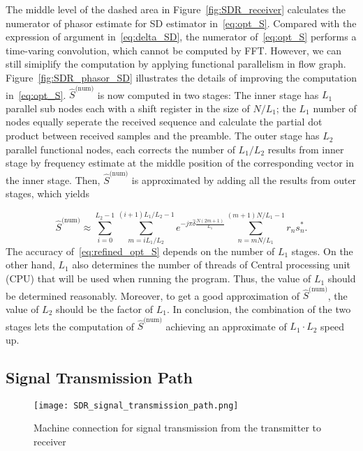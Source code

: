 The middle level of the dashed area in Figure~\ref{fig:SDR_receiver} calculates the numerator of phasor estimate for SD estimator in~\eqref{eq:opt_S}.
Compared with the expression of argument in~\eqref{eq:delta_SD}, the numerator of~\eqref{eq:opt_S} performs a time-varing convolution, which cannot be computed
by FFT. However, we can still simiplify the computation by applying functional parallelism in flow graph. 
Figure~\ref{fig:SDR_phasor_SD} illustrates the details of improving the computation in~\eqref{eq:opt_S}. 
$\hat{S}^{\text{(num)}}$ is now computed in two stages: The inner stage has $L_1$ parallel sub nodes each with a shift register in the size of
$N/L_1$; the $L_1$ number of nodes equally seperate the received sequence and calculate the partial dot product
between received samples and the preamble. The outer stage has $L_2$ parallel functional nodes, each corrects the number of $L_1/L_2$ results
from inner stage by frequency estimate at the middle position of the corresponding vector in the inner stage.
Then, $\hat{S}^{\text{(num)}}$ is approximated by adding all the results from outer stages, which yields

\begin{equation}
  \label{eq:refined_opt_S}
  \hat{S}^{\text{(num)}} \approx \sum_{i=0}^{L_2-1} \sum_{m=iL_1/L_2}^{(i+1)L_1/L_2-1} e^{-j\pi \hat{\delta}\frac{N(2m+1)}{L_1}}
  \sum_{n=mN/L_1}^{(m+1)N/L_1-1}r_ns_n^*.
\end{equation}
The accuracy of~\eqref{eq:refined_opt_S} depends on the number of $L_1$ stages. On the other hand,
$L_1$ also determines the number of threads of Central processing unit (CPU) that will be used when running the program.
Thus, the value of $L_1$ should be determined reasonably. 
Moreover, to get a good approximation of $\hat{S}^{\text{(num)}}$, the value of $L_2$ should be the factor of $L_1$.
In conclusion, the combination of the two stages lets the computation of 
$\hat{S}^{\text{(num)}}$ achieving an approximate of $L_1\cdot L_2$ speed up.

\subsection{Signal Transmission Path}

\begin{figure}[t]
  \centerline{\texttt{[image: SDR\_signal\_transmission\_path.png]}}
  \caption{Machine connection for signal transmission from the transmitter to receiver}
  \label{fig:SDR_signal_transmission_path}
  \end{figure}

